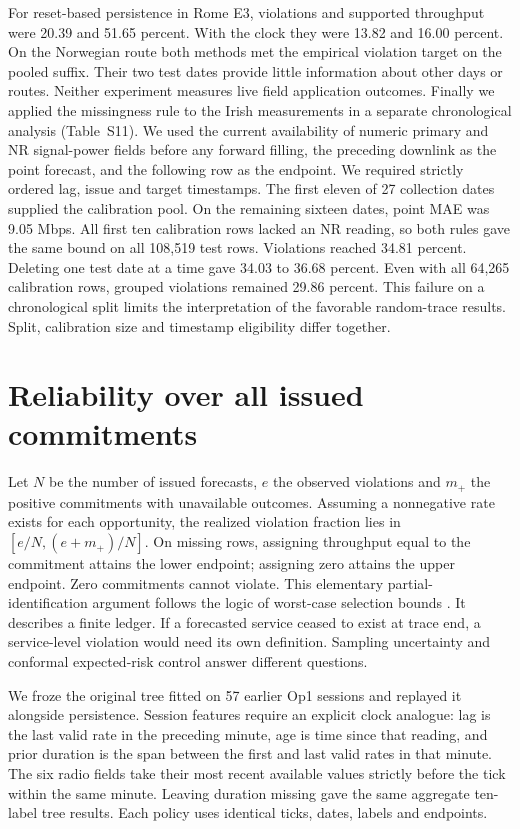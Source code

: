 \documentclass[journal,onecolumn,10pt]{IEEEtran}
\begin{document}
For reset-based persistence in Rome E3, violations and supported throughput were 20.39 and 51.65 percent. With the clock they were 13.82 and 16.00 percent. On the Norwegian route both methods met the empirical violation target on the pooled suffix. Their two test dates provide little information about other days or routes. Neither experiment measures live field application outcomes.
Finally we applied the missingness rule to the Irish measurements in a separate chronological analysis (Table~S11). We used the current availability of numeric primary and NR signal-power fields before any forward filling, the preceding downlink as the point forecast, and the following row as the endpoint. We required strictly ordered lag, issue and target timestamps. The first eleven of 27 collection dates supplied the calibration pool. On the remaining sixteen dates, point MAE was 9.05 Mbps. All first ten calibration rows lacked an NR reading, so both rules gave the same bound on all 108,519 test rows. Violations reached 34.81 percent. Deleting one test date at a time gave 34.03 to 36.68 percent. Even with all 64,265 calibration rows, grouped violations remained 29.86 percent. This failure on a chronological split limits the interpretation of the favorable random-trace results. Split, calibration size and timestamp eligibility differ together.

\section{Reliability over all issued commitments}
Let $N$ be the number of issued forecasts, $e$ the observed violations and $m_+$ the positive commitments with unavailable outcomes. Assuming a nonnegative rate exists for each opportunity, the realized violation fraction lies in $[e/N,(e+m_+)/N]$. On missing rows, assigning throughput equal to the commitment attains the lower endpoint; assigning zero attains the upper endpoint. Zero commitments cannot violate. This elementary partial-identification argument follows the logic of worst-case selection bounds \cite{manski1989selection}. It describes a finite ledger. If a forecasted service ceased to exist at trace end, a service-level violation would need its own definition. Sampling uncertainty and conformal expected-risk control \cite{angelopoulos2024risk} answer different questions.

We froze the original tree fitted on 57 earlier Op1 sessions and replayed it alongside persistence. Session features require an explicit clock analogue: lag is the last valid rate in the preceding minute, age is time since that reading, and prior duration is the span between the first and last valid rates in that minute. The six radio fields take their most recent available values strictly before the tick within the same minute. Leaving duration missing gave the same aggregate ten-label tree results. Each policy uses identical ticks, dates, labels and endpoints.
\end{document}
